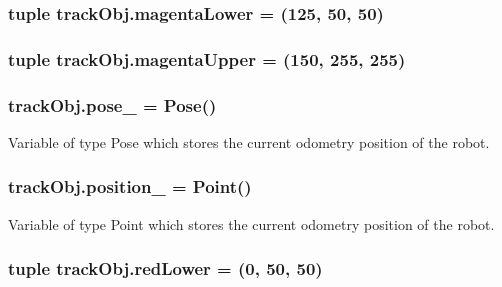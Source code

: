 \subsubsection[{\texorpdfstring{magenta\+Lower}{magentaLower}}]{\setlength{\rightskip}{0pt plus 5cm}tuple track\+Obj.\+magenta\+Lower = (125, 50, 50)}\hypertarget{namespacetrackObj_af3b410969d89c97e9d04a36fcc9df142}{}\label{namespacetrackObj_af3b410969d89c97e9d04a36fcc9df142}
\subsubsection[{\texorpdfstring{magenta\+Upper}{magentaUpper}}]{\setlength{\rightskip}{0pt plus 5cm}tuple track\+Obj.\+magenta\+Upper = (150, 255, 255)}\hypertarget{namespacetrackObj_a4ae931a000b87b27fc192cc9c6e59d4c}{}\label{namespacetrackObj_a4ae931a000b87b27fc192cc9c6e59d4c}
\subsubsection[{\texorpdfstring{pose\+\_\+}{pose_}}]{\setlength{\rightskip}{0pt plus 5cm}track\+Obj.\+pose\+\_\+ = Pose()}\hypertarget{namespacetrackObj_a6e0e2386b03c1220047a354e6d19fb6c}{}\label{namespacetrackObj_a6e0e2386b03c1220047a354e6d19fb6c}


Variable of type Pose which stores the current odometry position of the robot. 

\subsubsection[{\texorpdfstring{position\+\_\+}{position_}}]{\setlength{\rightskip}{0pt plus 5cm}track\+Obj.\+position\+\_\+ = Point()}\hypertarget{namespacetrackObj_a2528d68e56afa8757353f10b9bb0de98}{}\label{namespacetrackObj_a2528d68e56afa8757353f10b9bb0de98}


Variable of type Point which stores the current odometry position of the robot. 

\subsubsection[{\texorpdfstring{red\+Lower}{redLower}}]{\setlength{\rightskip}{0pt plus 5cm}tuple track\+Obj.\+red\+Lower = (0, 50, 50)}\hypertarget{namespacetrackObj_a254eae258b8c741920e95c1b9deb5b21}{}\label{namespacetrackObj_a254eae258b8c741920e95c1b9deb5b21}
